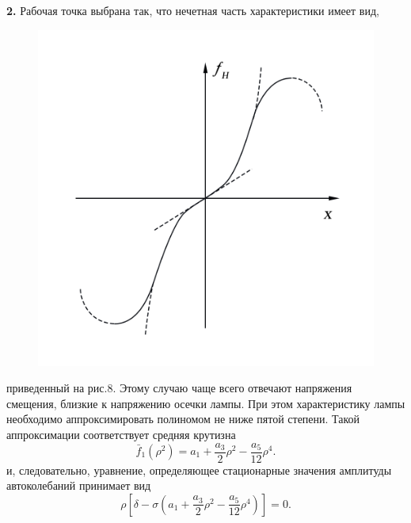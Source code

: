 {\bfseries 2.} Рабочая точка выбрана так, что нечетная часть характеристики имеет вид,
\begin{figure}
    \begin{center}
        \vspace{-10pt}
        \includegraphics[width=\linewidth]{pics/Ris8.png} 
        \vspace{-40pt}
        \label{fig:8}
        \vspace{20pt} 
    \end{center}
\end{figure}
приведенный на рис.8.
 Этому случаю чаще всего отвечают напряжения смещения, близкие к напряжению осечки лампы. При этом характеристику
  лампы необходимо аппроксимировать полиномом не ниже пятой степени. Такой аппроксимации соответствует средняя крутизна 
\begin{equation}
\label{eq:22}
\bar{f}_1(\rho^2)=a_1+\frac{a_3}{2}\rho^2-\frac{a_5}{12}\rho^4.
\end{equation}
и, следовательно, уравнение, определяющее стационарные значения амплитуды автоколебаний принимает вид
\begin{equation}
\label{eq:23}
\rho[\delta-\sigma(a_1+\frac{a_3}{2}\rho^2-\frac{a_5}{12}\rho^4)]=0.
\end{equation}

